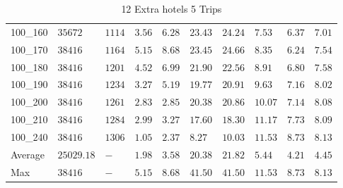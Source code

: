 \begin{center}
\begin{table}[]
\begin{tabular}{|lll|l|l|ll|lll|}
100\_160 & $35672   $  & $1114$ & $3.56$ & $6.28$   & $23.43$    & $24.24$   & $7.53 $& $6.37$   & $7.01$ \\
100\_170 & $38416   $  & $1164$ & $5.15$ & $8.68$   & $23.45$    & $24.66$   & $8.35 $& $6.24$   & $7.54$ \\
100\_180 & $38416   $  & $1201$ & $4.52$ & $6.99$   & $21.90$    & $22.56$   & $8.91 $& $6.80$   & $7.58$ \\
100\_190 & $38416   $  & $1234$ & $3.27$ & $5.19$   & $19.77$    & $20.91$   & $9.63 $& $7.16$   & $8.02$ \\
100\_200 & $38416   $  & $1261$ & $2.83$ & $2.85$   & $20.38$    & $20.86$   & $10.07$& $7.14$   & $8.08$ \\
100\_210 & $38416   $  & $1284$ & $2.99$ & $3.27$   & $17.60$    & $18.30$   & $11.17$& $7.73$   & $8.09$ \\
100\_240 & $38416   $  & $1306$ & $1.05$ & $2.37$   & $8.27$    & $10.03$   & $11.53$& $8.73$   & $8.13$ \\
\hline
Average  & $25029.18$  & $-   $ & $1.98$ & $3.58$   & $20.38$    & $21.82$   & $5.44 $& $4.21$   & $4.45$ \\
Max      & $38416   $  & $-   $ & $5.15$ & $8.68$   & $41.50$    & $41.50$   & $11.53$& $8.73$   & $8.13$ \\
\hline
\end{tabular}
\caption{12 Extra hotels 5 Trips}
\label{12-5}
\end{table}
\end{center}
